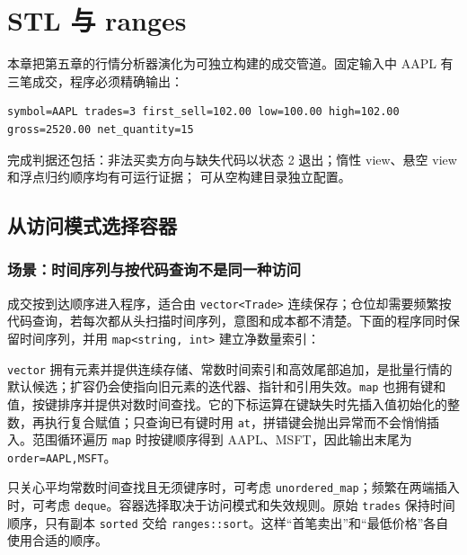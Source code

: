 \chapter{STL 与 ranges}


本章把第五章的行情分析器演化为可独立构建的成交管道。固定输入中 AAPL 有三笔成交，程序必须精确输出：

\begin{lstlisting}
symbol=AAPL trades=3 first_sell=102.00 low=100.00 high=102.00 gross=2520.00 net_quantity=15
\end{lstlisting}

完成判据还包括：非法买卖方向与缺失代码以状态 2 退出；惰性 view、悬空 view 和浮点归约顺序均有可运行证据； 可从空构建目录独立配置。

\section{从访问模式选择容器}

\subsection{场景：时间序列与按代码查询不是同一种访问}

成交按到达顺序进入程序，适合由 \texttt{vector<Trade>} 连续保存；仓位却需要频繁按代码查询，若每次都从头扫描时间序列，意图和成本都不清楚。下面的程序同时保留时间序列，并用 \texttt{map<string, int>} 建立净数量索引：



\texttt{vector} 拥有元素并提供连续存储、常数时间索引和高效尾部追加，是批量行情的默认候选；扩容仍会使指向旧元素的迭代器、指针和引用失效。\texttt{map} 也拥有键和值，按键排序并提供对数时间查找。它的下标运算在键缺失时先插入值初始化的整数，再执行复合赋值；只查询已有键时用 \texttt{at}，拼错键会抛出异常而不会悄悄插入。范围循环遍历 \texttt{map} 时按键顺序得到 AAPL、MSFT，因此输出末尾为 \texttt{order=AAPL,MSFT}。

只关心平均常数时间查找且无须键序时，可考虑 \texttt{unordered\_map}；频繁在两端插入时，可考虑 \texttt{deque}。容器选择取决于访问模式和失效规则。原始 \texttt{trades} 保持时间顺序，只有副本 \texttt{sorted} 交给 \texttt{ranges::sort}。这样“首笔卖出”和“最低价格”各自使用合适的顺序。

